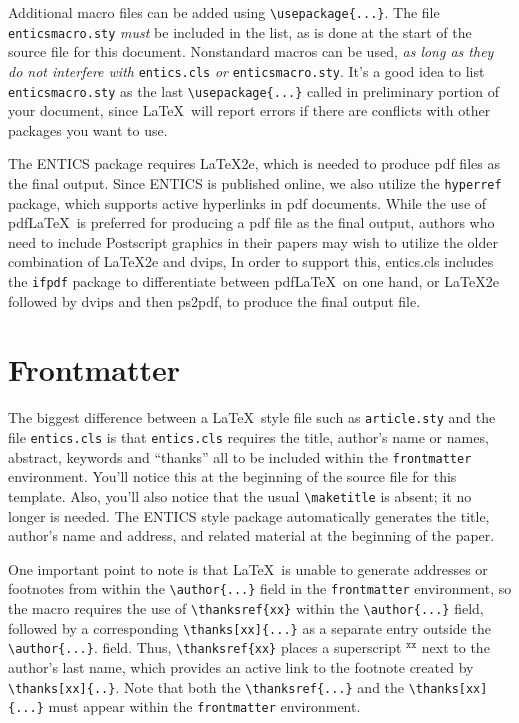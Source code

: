 \documentclass[twoside,11pt]{entics}
\begin{document}
Additional macro files can be added using \verb+\usepackage{...}+. The file
\texttt{entics\-macro.sty} \emph{must} be included in the list, as is done at
the start of the source file for this document. Nonstandard macros can be used,
\emph{as long as they do not interfere with} \texttt{entics.cls} \emph{or}
\texttt{enticsmacro.sty}. It's a good idea to list \texttt{enticsmacro.sty} as
the last \verb+\usepackage{...}+ called in preliminary portion of your
document, since \LaTeX\ will report errors if there are conflicts with other
packages you want to use.

The ENTICS package requires \LaTeX 2e, which is needed to produce pdf files as
the final output. Since ENTICS is published online, we also utilize the
\texttt{hyperref} package, which supports active hyperlinks in pdf documents.
While the use of pdf\LaTeX\ is preferred for producing a pdf file as the final
output, authors who need to include Postscript graphics in their papers may
wish to utilize the older combination of \LaTeX 2e and dvips, In order to
support this, entics.cls includes the \texttt{ifpdf} package to differentiate
between pdf\LaTeX\ on one hand, or \LaTeX 2e followed by dvips and then ps2pdf,
to produce the final output file.

\section{Frontmatter}
The biggest difference between a \LaTeX\ style file such as
\texttt{article.sty} and the file \texttt{entics.cls} is that
\texttt{entics.cls} requires the title, author's name or names, abstract,
keywords and ``thanks'' all to be included within the \texttt{frontmatter}
environment. You'll notice this at the beginning of the source file for this
template. Also, you'll also notice that the usual \verb+\maketitle+ is absent;
it no longer is needed. The ENTICS style package automatically generates the
title, author's name and address, and related material at the beginning of the
paper.

One important point to note is that \LaTeX\ is unable to generate addresses or
footnotes from within the \verb+\author{...}+ field in the \texttt{frontmatter}
environment, so the macro requires the use of \verb+\thanksref{xx}+ within the
\verb+\author{...}+ field, followed by a corresponding \verb+\thanks[xx]{...}+
as a separate entry outside the \verb+\author{...}+. field. Thus,
\verb+\thanksref{xx}+ places a superscript $^{\texttt{xx}}$ next to the
author's last name, which provides an active link to the footnote created by
\verb+\thanks[xx]{..}+. Note that both the \verb+\thanksref{...}+ and the
\verb+\thanks[xx]{...}+ must appear within the \texttt{frontmatter}
environment.
\end{document}
